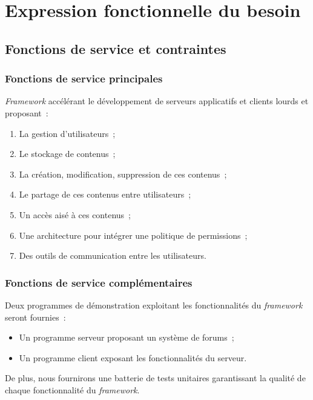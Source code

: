
\section{Expression fonctionnelle du besoin}

\subsection{Fonctions de service et contraintes}

\subsubsection{Fonctions de service principales}

\emph{Framework} accélérant le développement de serveurs applicatifs et clients lourds et proposant~:

\begin{enumerate}
	\item La gestion d'utilisateurs~;
	\item Le stockage de contenus~;
	\item La création, modification, suppression de ces contenus~;
	\item Le partage de ces contenus entre utilisateurs~;
	\item Un accès aisé à ces contenus~;
	\item Une architecture pour intégrer une politique de permissions~;
	\item Des outils de communication entre les utilisateurs.
\end{enumerate}

\subsubsection{Fonctions de service complémentaires}

Deux programmes de démonstration exploitant les fonctionnalités du \emph{framework} seront fournies~:

\begin{itemize}
 \item Un programme serveur proposant un système de forums~;
 \item Un programme client exposant les fonctionnalités du serveur.

\end{itemize}

De plus, nous fournirons une batterie de tests unitaires garantissant la qualité de chaque fonctionnalité du \emph{framework}.

